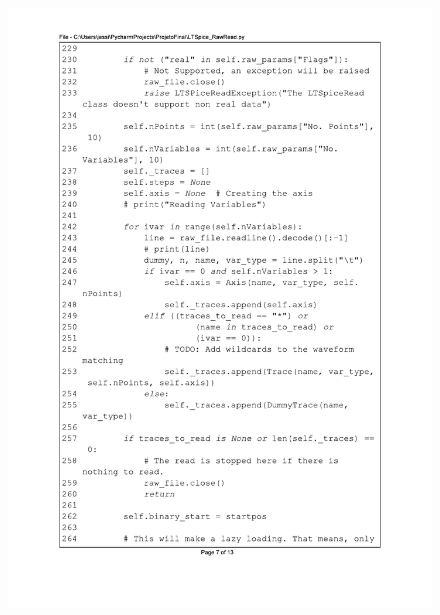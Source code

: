 \begin{figure}[]
\centering
\includegraphics[scale=0.9]{01_Pre_textuais/code/leitura7.pdf}
\end{figure}
